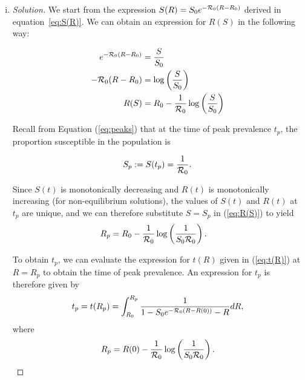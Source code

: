 \documentclass[12pt]{article}
\begin{document}
\begin{enumerate}[(a)]
\begin{enumerate}[(i)]
 \item \basicSIRanalQbii

{\color{blue}
\begin{proof}[Solution]
We start from the expression ${S(R)} = S_0 e^{-{\cal R}_0(R-R_0)}$ derived in equation~\eqref{eq:S(R)}. We can obtain an expression for $R(S)$ in the following way:

\begin{equation} \label{eq:R(S)}
\begin{aligned}
e^{-{\cal R}_0(R-R_0)} &= \frac{S}{S_0}\\
-{\cal R}_0(R-R_0) &= \log\left(\frac{S}{S_0}\right) \\
R(S) &= R_0 - \frac{1}{{\cal R}_0} \log\left(\frac{S}{S_0}\right)
\end{aligned}
\end{equation}

Recall from Equation (\ref{eq:peaks}) that at the time of peak prevalence $t_p$, the proportion susceptible in the population is

\begin{equation*}
\begin{aligned}
S_p := S(t_p) = \frac{1}{{\cal R}_0}.
\end{aligned}
\end{equation*}

Since $S(t)$ is monotonically decreasing and $R(t)$ is monotonically increasing (for non-equilibrium solutions), the values of $S(t)$ and $R(t)$ at $t_p$ are unique, and we can therefore substitute $S =S_p$ in (\ref{eq:R(S)}) to yield
\begin{equation*}
\begin{aligned}
R_p &= R_0 - \frac{1}{{\cal R}_0}\log\left(\frac{1}{S_0 {\cal R}_0}\right).
\end{aligned}
\end{equation*}

To obtain $t_p$, we can evaluate the expression for $t(R)$ given in (\ref{eq:t(R)}) at $R = R_p$ to obtain the time of peak prevalence. An expression for $t_p$ is therefore given by 
\begin{equation*}
\begin{aligned}
t_p = t(R_p)=\int_{R_0}^{R_p} \frac{1}{1-S_0e^{-{\cal R}_0(R-R(0))}-R} dR, 
\end{aligned}
\end{equation*}
where 
$$
R_p = R(0) - \frac{1}{{\cal R}_0}\log\left(\frac{1}{S_0 {\cal R}_0}\right).
$$

\end{proof}
}


\end{enumerate}
\end{enumerate}
\end{document}
